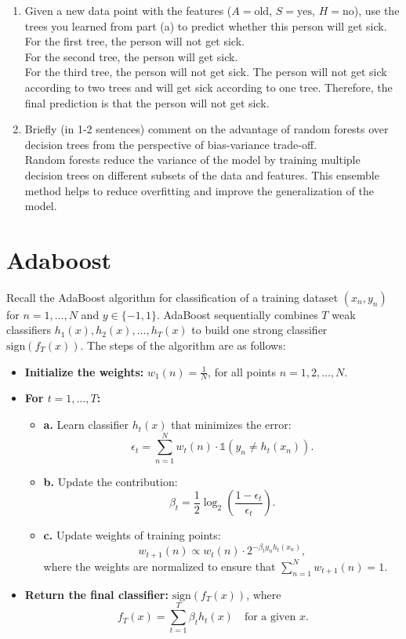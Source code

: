 \documentclass[a3paper,12pt]{extarticle} %
\begin{document}
\begin{enumerate}
        \item  Given a new data point with the features ($A = \text{old}$, $S = \text{yes}$, $H = \text{no}$), use the trees you learned from part (a) to predict whether this person will get sick.
        \\ For the first tree, the person will not get sick.
        \\ For the second tree, the person will get sick.
        \\ For the third tree, the person will not get sick.
        The person will  not get sick according to two trees and will  get sick according to one tree. Therefore, the final prediction is that the person will not get sick.
        \item  Briefly (in 1-2 sentences) comment on the advantage of random forests over decision trees from the perspective of bias-variance trade-off.
        \\ Random forests reduce the variance of the model by training multiple decision trees on different subsets of the data and features. This ensemble method helps to reduce overfitting and improve the generalization of the model.
    \end{enumerate}

\newpage
\section{Adaboost}
Recall the AdaBoost algorithm for classification of a training dataset $(x_n, y_n)$ for $n = 1, \dots, N$ and $y \in \{-1, 1\}$. AdaBoost sequentially combines $T$ weak classifiers $h_1(x), h_2(x), \dots, h_T(x)$ to build one strong classifier $\text{sign}(f_T(x))$. The steps of the algorithm are as follows:
\begin{itemize}
    \item \textbf{Initialize the weights:} $w_1(n) = \frac{1}{N}$, for all points $n = 1, 2, \dots, N$.
    \item \textbf{For $t = 1, \dots, T$:}
    \begin{itemize}
        \item \textbf{a.} Learn classifier $h_t(x)$ that minimizes the error:
        \[
        \epsilon_t = \sum_{n=1}^N w_t(n) \cdot \mathbb{1}(y_n \neq h_t(x_n)).
        \]
        \item \textbf{b.} Update the contribution:
        \[
        \beta_t = \frac{1}{2} \log_2\left(\frac{1 - \epsilon_t}{\epsilon_t}\right).
        \]
        \item \textbf{c.} Update weights of training points:
        \[
        w_{t+1}(n) \propto w_t(n) \cdot 2^{-\beta_t y_n h_t(x_n)},
        \]
        where the weights are normalized to ensure that $\sum_{n=1}^N w_{t+1}(n) = 1$.
    \end{itemize}
    \item \textbf{Return the final classifier:} $\text{sign}(f_T(x))$, where
    \[
    f_T(x) = \sum_{t=1}^T \beta_t h_t(x) \quad \text{for a given } x.
    \]
\end{itemize}
\end{document}
